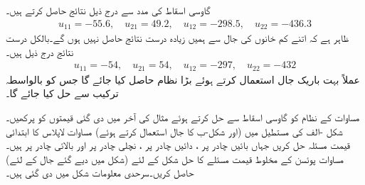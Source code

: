 گاوسی اسقاط کی مدد سے درج ذیل نتائج حاصل کرتے ہیں۔
\begin{align*}
u_{11}=-55.6,\quad u_{21}=49.2,\quad u_{12}=-298.5,\quad u_{22}=-436.3
\end{align*}
ظاہر ہے کہ اتنے کم خانوں کی جال سے ہمیں زیادہ درست نتائج حاصل نہیں ہوں گے۔بالکل درست نتائج درج ذیل ہیں۔
\begin{align*}
u_{11}=-54,\quad u_{21}=54,\quad u_{12}=-297,\quad u_{22}=-432
\end{align*}
عملاً بہت باریک جال استعمال کرتے ہوئے بڑا نظام حاصل کیا جائے گا جس کو بالواسطہ ترکیب سے حل کیا جائے گا۔

\quad 
مساوات  کے نظام کو گاوسی اسقاط سے حل کرتے ہوئے مثال  کی آخر میں دی گئی قیمتوں کو پرکھیں۔
\quad
شکل -الف کی مستطیل میں  (اور شکل-ب کا جال استعمال کرتے ہوئے) مساوات لاپلاس  کا ابتدائی قیمت مسئلہ حل کریں جہاں بائیں چادر پر ، دائیں چادر پر ، نچلی چادر پر  اور بالائی چادر پر  ہیں۔
\quad
مساوات پوئسن  کے مخلوط قیمت مسئلے کا حل شکل  کے لئے  (شکل میں دیے گئے جال کے لئے) حاصل کریں۔سرحدی معلومات شکل میں دی گئی ہیں۔
